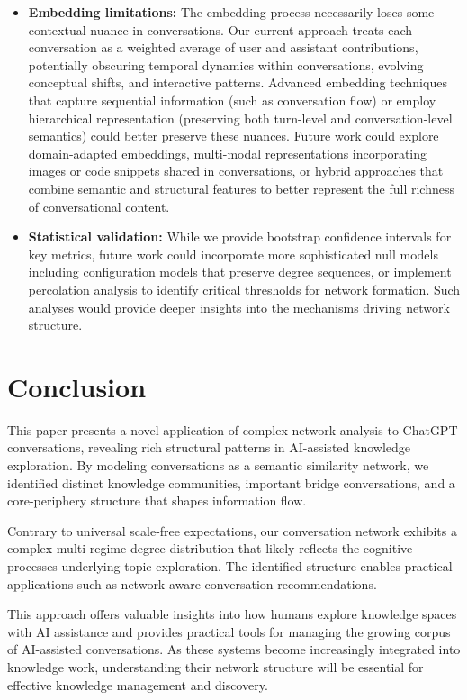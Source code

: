 \documentclass[10pt, a4paper]{article}
\begin{document}
\begin{itemize}
    \item \textbf{Embedding limitations:} The embedding process necessarily loses some contextual nuance in conversations. Our current approach treats each conversation as a weighted average of user and assistant contributions, potentially obscuring temporal dynamics within conversations, evolving conceptual shifts, and interactive patterns. Advanced embedding techniques that capture sequential information (such as conversation flow) or employ hierarchical representation (preserving both turn-level and conversation-level semantics) could better preserve these nuances. Future work could explore domain-adapted embeddings, multi-modal representations incorporating images or code snippets shared in conversations, or hybrid approaches that combine semantic and structural features to better represent the full richness of conversational content.
    
    \item \textbf{Statistical validation:} While we provide bootstrap confidence intervals for key metrics, future work could incorporate more sophisticated null models including configuration models that preserve degree sequences, or implement percolation analysis to identify critical thresholds for network formation. Such analyses would provide deeper insights into the mechanisms driving network structure.
\end{itemize}

\section{Conclusion}

This paper presents a novel application of complex network analysis to ChatGPT conversations, revealing rich structural patterns in AI-assisted knowledge exploration. By modeling conversations as a semantic similarity network, we identified distinct knowledge communities, important bridge conversations, and a core-periphery structure that shapes information flow.

Contrary to universal scale-free expectations, our conversation network exhibits a complex multi-regime degree distribution that likely reflects the cognitive processes underlying topic exploration. The identified structure enables practical applications such as network-aware conversation recommendations.

This approach offers valuable insights into how humans explore knowledge spaces with AI assistance and provides practical tools for managing the growing corpus of AI-assisted conversations. As these systems become increasingly integrated into knowledge work, understanding their network structure will be essential for effective knowledge management and discovery.
\end{document}
